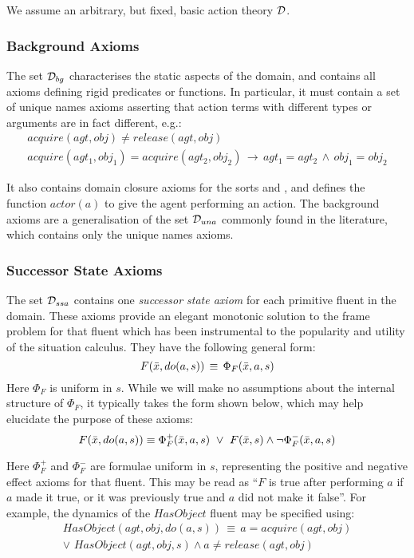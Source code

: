 We assume an arbitrary, but fixed, basic action theory $\mathcal{D}$.


\subsubsection{Background Axioms}

The set $\mathcal{D}_{bg}$ characterises the static aspects of the domain,
and contains all axioms defining rigid predicates or functions. In
particular, it must contain a set of unique names axioms asserting
that action terms with different types or arguments are in fact different,
e.g.:\begin{gather*}
acquire(agt,obj)\neq release(agt,obj)\\
acquire(agt_{1},obj_{1})=acquire(agt_{2},obj_{2})\,\rightarrow\, agt_{1}=agt_{2}\,\wedge\, obj_{1}=obj_{2}\end{gather*}


It also contains domain closure axioms for the sorts  and , and defines the function $actor(a)$ to
give the agent performing an action. The background axioms are a generalisation
of the set $\mathcal{D}_{una}$ commonly found in the literature, which contains
only the unique names axioms.


\subsubsection{Successor State Axioms}

The set $\mathcal{D}_{ssa}$ contains one \emph{successor state axiom} for
each primitive fluent in the domain. These axioms provide an elegant
monotonic solution to the frame problem for that fluent \citep{reiter91frameprob}
which has been instrumental to the popularity and utility of the situation
calculus. They have the following general form:\[
F(\bar{x},do(a,s))\,\equiv\,\Phi_{F}(\bar{x},a,s)\]
 Here $\Phi_{F}$ is uniform in $s$. While we will make no assumptions
about the internal structure of $\Phi_{F}$, it typically takes the
form shown below, which may help elucidate the purpose of these axioms:
\[
F(\bar{x},do(a,s))\equiv\Phi_{F}^{+}(\bar{x},a,s)\,\,\vee\,\, F(\bar{x},s)\wedge\neg\Phi_{F}^{-}(\bar{x},a,s)\]


Here $\Phi_{F}^{+}$ and $\Phi_{F}^{-}$ are formulae uniform in $s$,
representing the positive and negative effect axioms for that fluent.
This may be read as {}``$F$ is true after performing $a$ if $a$
made it true, or it was previously true and $a$ did not make it false''.
For example, the dynamics of the $HasObject$ fluent may be specified
using:\begin{multline*}
HasObject(agt,obj,do(a,s))\,\equiv\, a=acquire(agt,obj)\\
\vee\,\, HasObject(agt,obj,s)\wedge a\neq release(agt,obj)\end{multline*}


